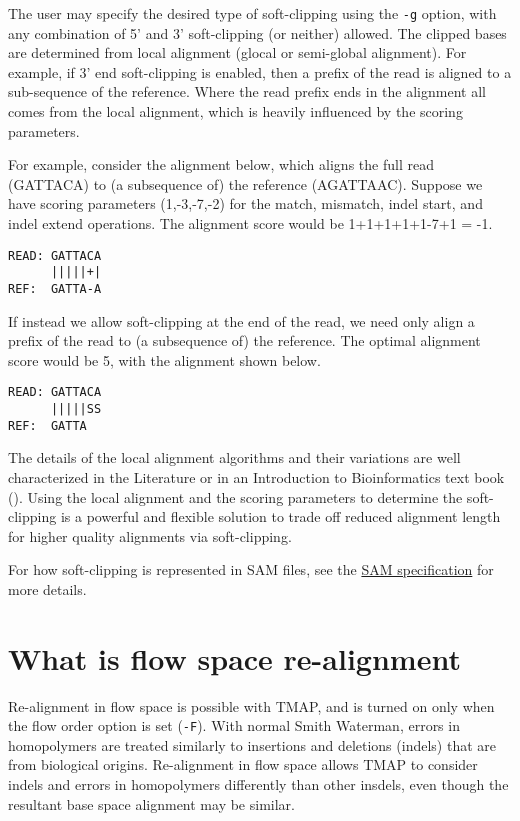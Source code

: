 \documentclass[a4paper,12pt]{book}
\newcommand{\TT}[1]{{\tt #1}} %
\begin{document}
The user may specify the desired type of soft-clipping using the \TT{-g} option, with any combination of 5' and 3' soft-clipping (or neither) allowed. 
The clipped bases are determined from local alignment (glocal or semi-global alignment).  
For example, if 3' end soft-clipping is enabled, then a prefix of the read is aligned to a sub-sequence of the reference.  
Where the read prefix ends in the alignment all comes from the local alignment, which is heavily influenced by the scoring parameters. 

For example, consider the alignment below, which aligns the full read (GATTACA) to (a subsequence of) the reference (AGATTAAC).  
Suppose we have scoring parameters (1,-3,-7,-2) for the match, mismatch, indel start, and indel extend operations.  
The alignment score would be 1+1+1+1+1-7+1 = -1.

\begin{verbatim}
READ: GATTACA
      |||||+|
REF:  GATTA-A
\end{verbatim}

If instead we allow soft-clipping at the end of the read, we need only align a prefix of the read to (a subsequence of) the reference.  
The optimal alignment score would be 5, with the alignment shown below.
\begin{verbatim}
READ: GATTACA
      |||||SS
REF:  GATTA
\end{verbatim}

The details of the local alignment algorithms and their variations are well characterized in the Literature or in an Introduction to Bioinformatics text book (\cite{jones2004}).  
Using the local alignment and the scoring parameters to determine the soft-clipping is a powerful and flexible solution to trade off reduced alignment length for higher quality alignments via soft-clipping.

For how soft-clipping is represented in SAM files, see the \href{http://samtools.sourceforge.net/SAM1.pdf}{SAM specification} for more details.

\section{What is flow space re-alignment}
\label{sec:fs-realign}
Re-alignment in flow space is possible with TMAP, and is turned on only when the flow order option is set (\TT{-F}).
With normal Smith Waterman, errors in homopolymers are treated similarly to insertions and deletions (indels) that are from biological origins.
Re-alignment in flow space allows TMAP to consider indels and errors in homopolymers differently than other insdels, even though the resultant base space alignment may be similar.
\end{document}
